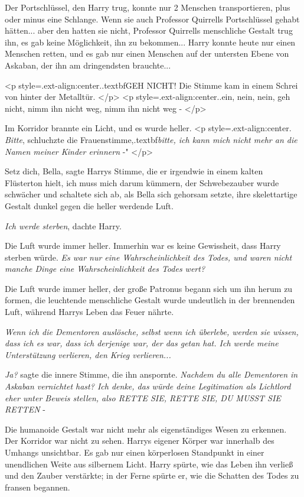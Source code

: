 Der Portschlüssel, den Harry trug, konnte nur 2 Menschen transportieren, plus
oder minus eine Schlange. Wenn sie auch Professor Quirrells Portschlüssel gehabt
hätten... aber den hatten sie nicht, Professor Quirrells menschliche Gestalt
trug ihn, es gab keine Möglichkeit, ihn zu bekommen... Harry konnte heute nur
einen Menschen retten, und es gab nur einen Menschen auf der untersten Ebene von
Askaban, der ihn am dringendsten brauchte...

<p style=\grqq{}.ext-align:center\grqq{}.\grqq{}.textbf{GEH NICHT!}\grqq{} Die
Stimme kam in einem Schrei von hinter der Metalltür. </p> <p
style=\grqq{}.ext-align:center\grqq{}.\grqq{}.ein, nein, nein, geh nicht, nimm
ihn nicht weg, nimm ihn nicht weg -\grqq{} </p>

Im Korridor brannte ein Licht, und es wurde heller. <p
style=\grqq{}.ext-align:center\grqq{}. \glqq \emph{Bitte}\grqq{}, schluchzte die
Frauenstimme,\grqq{}.textbf{\emph{bitte, ich kann mich nicht mehr an die Namen
meiner Kinder erinnern }}-" </p>

\glqq Setz dich, Bella\grqq{}, sagte Harrys Stimme, die er irgendwie in einem
kalten Flüsterton hielt, \glqq ich muss mich darum kümmern\grqq{}, der
Schwebezauber wurde schwächer und schaltete sich ab, als Bella sich gehorsam
setzte, ihre skelettartige Gestalt dunkel gegen die heller werdende Luft.

\emph{Ich werde sterben}, dachte Harry.

Die Luft wurde immer heller. Immerhin war es keine Gewissheit, dass Harry
sterben würde. \emph{Es war nur eine Wahrscheinlichkeit des Todes, und waren
nicht manche Dinge eine Wahrscheinlichkeit des Todes wert? }

Die Luft wurde immer heller, der große Patronus begann sich um ihn herum zu
formen, die leuchtende menschliche Gestalt wurde undeutlich in der brennenden
Luft, während Harrys Leben das Feuer nährte.

\emph{Wenn ich die Dementoren auslösche, selbst wenn ich überlebe, werden sie wissen, dass ich es war, dass ich derjenige war, der das getan hat. Ich werde meine Unterstützung verlieren, den Krieg verlieren... }

\emph{Ja?} sagte die innere Stimme, die ihn anspornte. \emph{Nachdem du alle
Dementoren in Askaban vernichtet hast? Ich denke, das würde deine Legitimation
als Lichtlord eher unter Beweis stellen, also RETTE SIE, RETTE SIE, DU MUSST SIE
RETTEN }-

Die humanoide Gestalt war nicht mehr als eigenständiges Wesen zu erkennen. Der
Korridor war nicht zu sehen. Harrys eigener Körper war innerhalb des Umhangs
unsichtbar. Es gab nur einen körperlosen Standpunkt in einer unendlichen Weite
aus silbernem Licht. Harry spürte, wie das Leben ihn verließ und den Zauber
verstärkte; in der Ferne spürte er, wie die Schatten des Todes zu fransen
begannen.


